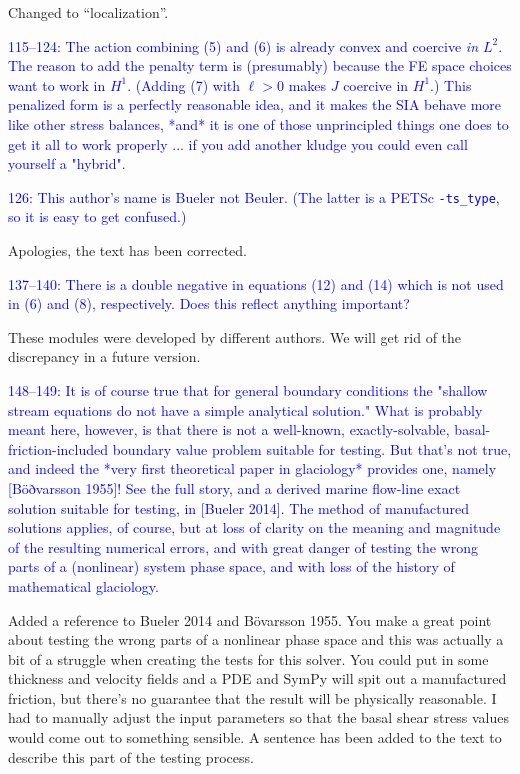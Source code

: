 \documentclass{article}
\theoremstyle{definition}
\theoremstyle{plain}
\begin{document}
Changed to ``localization''.

\textcolor{blue}{115--124:  The action combining (5) and (6) is already convex and coercive \emph{in $L^2$}.  The reason to add the penalty term is (presumably) because the FE space choices want to work in $H^1$.  (Adding (7) with $\ell > 0$ makes $J$ coercive in $H^1$.)  This penalized form is a perfectly reasonable idea, and it makes the SIA behave more like other stress balances, *and* it is one of those unprincipled things one does to get it all to work properly ... if you add another kludge you could even call yourself a "hybrid".}

\textcolor{blue}{126:  This author's name is Bueler not Beuler.  (The latter is a PETSc \texttt{-ts\_type}, so it is easy to get confused.)}

Apologies, the text has been corrected.

\textcolor{blue}{137--140:  There is a double negative in equations (12) and (14) which is not used in (6) and (8), respectively.  Does this reflect anything important?}

These modules were developed by different authors.
We will get rid of the discrepancy in a future version.

\textcolor{blue}{148--149:  It is of course true that for general boundary conditions the "shallow stream equations do not have a simple analytical solution."  What is probably meant here, however, is that there is not a well-known, exactly-solvable, basal-friction-included boundary value problem suitable for testing.  But that's not true, and indeed the *very first theoretical paper in glaciology* provides one, namely [Böðvarsson 1955]!  See the full story, and a derived marine flow-line exact solution suitable for testing, in [Bueler 2014].  The method of manufactured solutions applies, of course, but at loss of clarity on the meaning and magnitude of the resulting numerical errors, and with great danger of testing the wrong parts of a (nonlinear) system phase space, and with loss of the history of mathematical glaciology.}

Added a reference to Bueler 2014 and B\"o\dh varsson 1955.
You make a great point about testing the wrong parts of a nonlinear phase space and this was actually a bit of a struggle when creating the tests for this solver.
You could put in some thickness and velocity fields and a PDE and SymPy will spit out a manufactured friction, but there's no guarantee that the result will be physically reasonable.
I had to manually adjust the input parameters so that the basal shear stress values would come out to something sensible.
A sentence has been added to the text to describe this part of the testing process.
\end{document}
